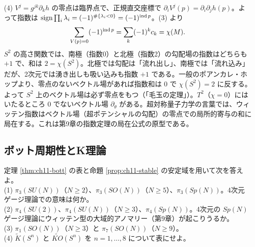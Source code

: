 \begin{solution}
(4) $V^j=g^{jk}\partial_kh$ の零点は臨界点で、正規直交座標で $\partial_iV^j(p)=\partial_i\partial_jh(p)$。よって指数は $\operatorname{sign}\prod_i\lambda_i=(-1)^{\#\{\lambda_i<0\}}=(-1)^{\operatorname{ind} p}$。(3) より
\[
\sum_{V(p)=0}(-1)^{\operatorname{ind} p}=\sum_k(-1)^kc_k=\chi(M).
\]
$S^2$ の高さ関数では、南極（指数0）と北極（指数2）の勾配場の指数はどちらも $+1$ で、和は $2=\chi(S^2)$。北極では勾配は「流れ出し」、南極では「流れ込み」だが、2次元では湧き出しも吸い込みも指数 $+1$ である。一般のポアンカレ・ホップより、零点のないベクトル場があれば指数和は $0$ で $\chi(S^2)=2$ に反する。よって $S^2$ 上のベクトル場は必ず零点をもつ（「毛玉の定理」）。$T^2$（$\chi=0$）にはいたるところ $0$ でないベクトル場 $\partial_\theta$ がある。超対称量子力学の言葉では、ウィッテン指数はベクトル場（超ポテンシャルの勾配）の零点での局所的寄与の和に局在する。これは第9章の指数定理の局在公式の原型である。
\end{solution}

\subsection{ボット周期性とK理論}

\begin{problem}[難易度 A]\label{ch11-prob-bott}
定理 \ref{thm:ch11-bott} の表と命題 \ref{prop:ch11-stable} の安定域を用いて次を答えよ。\\
(1) $\pi_3(SU(N))$（$N\ge2$）、$\pi_3(SO(N))$（$N\ge5$）、$\pi_3(Sp(N))$。4次元ゲージ理論での意味は何か。\\
(2) $\pi_4(SU(2))$、$\pi_4(SU(N))$（$N\ge3$）、$\pi_4(Sp(N))$。4次元の $Sp(N)$ ゲージ理論にウィッテン型の大域的アノマリー（第9章）が起こりうるか。\\
(3) $\pi_1(SO(N))$（$N\ge3$）と $\pi_7(SO(N))$（$N\ge9$）。\\
(4) $\tilde K(S^n)$ と $\widetilde{KO}(S^n)$ を $n=1,\dots,8$ について表にせよ。
\end{problem}

